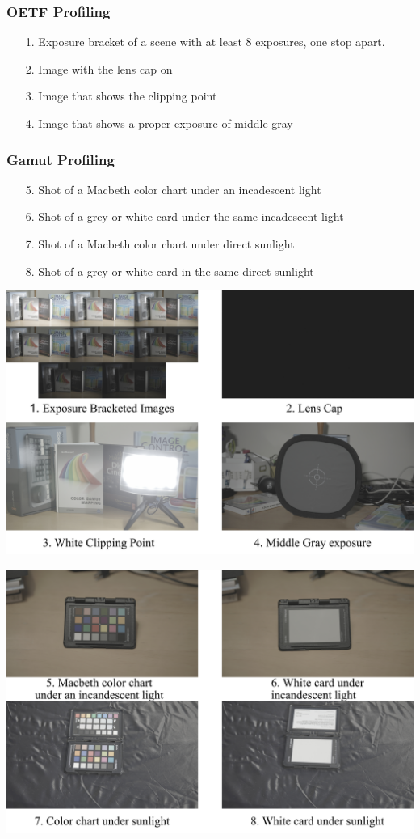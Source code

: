 \documentclass[twoside]{article}
\begin{document}
\subsubsection*{OETF Profiling}
\begin{enumerate}
    \item[1.] Exposure bracket of a scene with at least 8 exposures, one stop apart.
    \item[2.] Image with the lens cap on
    \item[3.] Image that shows the clipping point
    \item[4.] Image that shows a proper exposure of middle gray
\end{enumerate}

\subsubsection*{Gamut Profiling}
\begin{enumerate}
    \item[5.] Shot of a Macbeth color chart under an incadescent light
    \item[6.] Shot of a grey or white card under the same incadescent light
    \item[7.] Shot of a Macbeth color chart under direct sunlight
    \item[8.] Shot of a grey or white card in the same direct sunlight
\end{enumerate}

\newpage
\includegraphics[scale=0.35]{OETF Images.jpg}

\includegraphics[scale=0.35]{Gamut Images.jpg}
\end{document}
